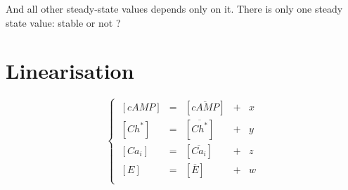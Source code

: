 \documentclass[aps,12pt]{revtex4}
\begin{document}
And all other steady-state values depends only on it.
There is only one steady state value: stable or not ?

\section{Linearisation}

\begin{equation}
\left\lbrace
\begin{array}{lclcl}
~[cAMP] & = & [\overline{cAMP}] & + & x\\
~[Ch^\ast] & = & [\overline{Ch^\ast}] & + & y\\
~[Ca_i]    & = & [\overline{Ca_i}]    & + & z\\
~[E]       & = & [\overline{E}] & + & w\\
\end{array}
\right.
\end{equation}
\end{document}
